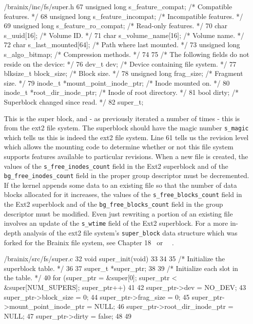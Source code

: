\documentclass{article}
\begin{document}
\begin{code}{/brainix/inc/fs/super.h}
{67      unsigned long s_feature_compat;    /* Compatible features.            */
68      unsigned long s_feature_incompat;  /* Incompatible features.          */
69      unsigned long s_feature_ro_compat; /* Read-only features.             */
70      char s_uuid[16];                   /* Volume ID.                      */
71      char s_volume_name[16];            /* Volume name.                    */
72      char s_last_mounted[64];           /* Path where last mounted.        */
73      unsigned long s_algo_bitmap;       /* Compression methods.            */
74 
75      /* The following fields do not reside on the device: */
76      dev_t dev;                         /* Device containing file system. */
77      blksize_t block_size;              /* Block size.                    */
78      unsigned long frag_size;           /* Fragment size.                 */
79      inode_t *mount_point_inode_ptr;    /* Inode mounted on.              */
80      inode_t *root_dir_inode_ptr;       /* Inode of root directory.       */
81      bool dirty;                        /* Superblock changed since read. */
82 } super_t;
\end{code}
This is the super block, and - as previously iterated a number of times - this is from the ext2 file system. The superblock should have the magic number \verb|s_magic| which tells us this is indeed the ext2 file system. Line 61 tells us the revision level which allows the mounting code to determine whether or not this file system supports features available to particular revisions. When a new file is created, the values of the \verb|s_free_inodes_count| field in the Ext2 superblock and of the \verb|bg_free_inodes_count| field in the proper group descriptor must be decremented. If the kernel appends some data to an existing file so that the number of data blocks allocated for it increases, the values of the \verb|s_free_blocks_count| field in the Ext2 superblock and of the \verb|bg_free_blocks_count| field in the group descriptor must be modified. Even just rewriting a portion of an existing file involves an update of the \verb|s_wtime| field of the Ext2 superblock. For a more in-depth analysis of the ext2 file system's \verb|super_block| data structure which was forked for the Brainix file system, see Chapter 18~\cite{linuxbook} or \cite{3}~\cite{7}~\cite{8}.
\begin{code}{/brainix/src/fs/super.c}
32 void super_init(void)
33{
34
35 /* Initialize the superblock table. */
36
37      super_t *super_ptr;
38
39      /* Initialize each slot in the table. */
40      for (super_ptr = &super[0]; super_ptr < &super[NUM_SUPERS]; super_ptr++)
41      {
42           super_ptr->dev = NO_DEV;
43           super_ptr->block_size = 0;
44           super_ptr->frag_size = 0;
45           super_ptr->mount_point_inode_ptr = NULL;
46           super_ptr->root_dir_inode_ptr = NULL;
47           super_ptr->dirty = false;
48      }
49 }
\end{code}
\end{document}
